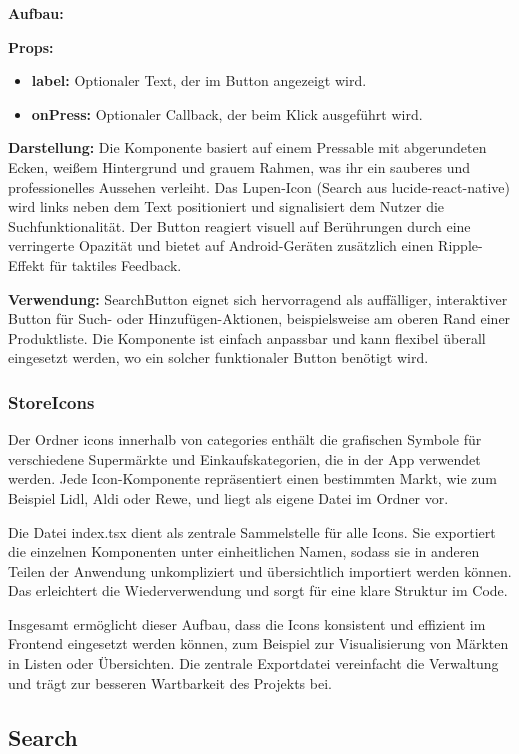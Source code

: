\noindent\textbf{Aufbau:}

\textbf{Props:}
\begin{itemize}
    \item \textbf{label:} Optionaler Text, der im Button angezeigt wird.
    \item \textbf{onPress:} Optionaler Callback, der beim Klick ausgeführt wird.
\end{itemize}

\textbf{Darstellung:}
Die Komponente basiert auf einem Pressable mit abgerundeten Ecken, weißem Hintergrund und grauem Rahmen, was ihr ein sauberes und professionelles Aussehen verleiht. Das Lupen-Icon (Search aus lucide-react-native) wird links neben dem Text positioniert und signalisiert dem Nutzer die Suchfunktionalität. Der Button reagiert visuell auf Berührungen durch eine verringerte Opazität und bietet auf Android-Geräten zusätzlich einen Ripple-Effekt für taktiles Feedback.

\noindent\textbf{Verwendung:} SearchButton eignet sich hervorragend als auffälliger, interaktiver Button für Such- oder Hinzufügen-Aktionen, beispielsweise am oberen Rand einer Produktliste. Die Komponente ist einfach anpassbar und kann flexibel überall eingesetzt werden, wo ein solcher funktionaler Button benötigt wird.

\subsubsection{StoreIcons}
Der Ordner icons innerhalb von categories enthält die grafischen Symbole für verschiedene Supermärkte und Einkaufskategorien, die in der App verwendet werden. Jede Icon-Komponente repräsentiert einen bestimmten Markt, wie zum Beispiel Lidl, Aldi oder Rewe, und liegt als eigene Datei im Ordner vor.

Die Datei index.tsx dient als zentrale Sammelstelle für alle Icons. Sie exportiert die einzelnen Komponenten unter einheitlichen Namen, sodass sie in anderen Teilen der Anwendung unkompliziert und übersichtlich importiert werden können. Das erleichtert die Wiederverwendung und sorgt für eine klare Struktur im Code.

Insgesamt ermöglicht dieser Aufbau, dass die Icons konsistent und effizient im Frontend eingesetzt werden können, zum Beispiel zur Visualisierung von Märkten in Listen oder Übersichten. Die zentrale Exportdatei vereinfacht die Verwaltung und trägt zur besseren Wartbarkeit des Projekts bei.

\subsection{Search}

